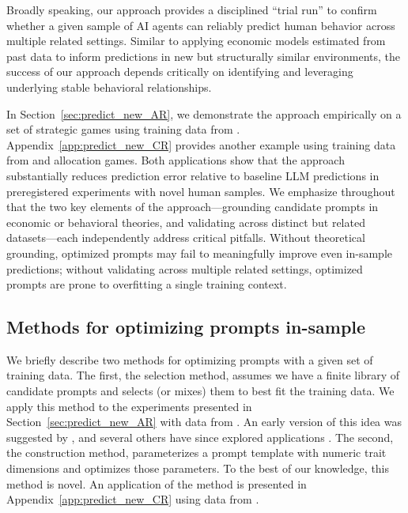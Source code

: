 \documentclass[11pt]{article}
\theoremstyle{definition}
\newcommand{\aisub}{AI agent}
\newcommand{\persona}{prompt}
\begin{document}
Broadly speaking, our approach provides a disciplined ``trial run'' to confirm whether a given sample of \aisub{s} can reliably predict human behavior across multiple related settings.
Similar to applying economic models estimated from past data to inform predictions in new but structurally similar environments, the success of our approach depends critically on identifying and leveraging underlying stable behavioral relationships.

In Section~\ref{sec:predict_new_AR}, we demonstrate the approach empirically on a set of strategic games using training data from \cite{1120Arad2012}.
Appendix~\ref{app:predict_new_CR} provides another example using training data from \citep{charness2002understanding} and allocation games.
Both applications show that the approach substantially reduces prediction error relative to baseline LLM predictions in preregistered experiments with novel human samples.
We emphasize throughout that the two key elements of the approach---grounding candidate \persona{s} in economic or behavioral theories, and validating across distinct but related datasets---each independently address critical pitfalls.
Without theoretical grounding, optimized \persona{s} may fail to meaningfully improve even in-sample predictions; without validating across multiple related settings, optimized \persona{s} are prone to overfitting a single training context.

\subsection{Methods for optimizing \persona{s} in-sample}

We briefly describe two methods for optimizing \persona{s} with a given set of training data.
The first, the selection method, assumes we have a finite library of candidate \persona{s} and selects (or mixes) them to best fit the training data. 
We apply this method to the experiments presented in Section~\ref{sec:predict_new_AR} with data from \cite{1120Arad2012}.
An early version of this idea was suggested by \cite{horton2023large}, and several others have since explored applications \citep{leng2024calibrate,Jackson2025Mixture,bui2025mixture}.
The second, the construction method, parameterizes a prompt template with numeric trait dimensions and optimizes those parameters.
To the best of our knowledge, this method is novel.
An application of the method is presented in Appendix~\ref{app:predict_new_CR} using data from \cite{charness2002understanding}.
\end{document}
